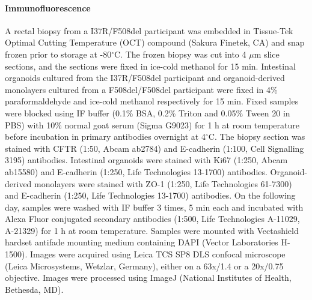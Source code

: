 \paragraph{Immunofluorescence} A rectal biopsy from a I37R/F508del participant was embedded in Tissue-Tek Optimal Cutting Temperature (OCT) compound (Sakura Finetek, CA) and snap frozen prior to storage at -80$^\circ$C. The frozen biopsy was cut into 4 $\mu$m slice sections, and the sections were fixed in ice-cold methanol for 15 min. Intestinal organoids cultured from the I37R/F508del participant and organoid-derived monolayers cultured from a F508del/F508del participant were fixed in 4\% paraformaldehyde and ice-cold methanol respectively for 15 min. Fixed samples were blocked using IF buffer (0.1\% BSA, 0.2\% Triton and 0.05\% Tween 20 in PBS) with 10\% normal goat serum (Sigma G9023) for 1 h at room temperature before incubation in primary antibodies overnight at 4$^\circ$C. The biopsy section was stained with CFTR (1:50, Abcam ab2784) and E-cadherin (1:100, Cell Signalling 3195) antibodies. Intestinal organoids were stained with Ki67 (1:250, Abcam ab15580) and E-cadherin (1:250, Life Technologies 13-1700) antibodies. Organoid-derived monolayers were stained with ZO-1 (1:250, Life Technologies 61-7300) and E-cadherin (1:250, Life Technologies 13-1700) antibodies. On the following day, samples were washed with IF buffer 3 times, 5 min each and incubated with Alexa Fluor conjugated secondary antibodies (1:500, Life Technologies A-11029, A-21329) for 1 h at room temperature. Samples were mounted with Vectashield hardset antifade mounting medium containing DAPI (Vector Laboratories H-1500). Images were acquired using Leica TCS SP8 DLS confocal microscope (Leica Microsystems, Wetzlar, Germany), either on a 63x/1.4 or a 20x/0.75 objective. Images were processed using ImageJ (National Institutes of Health, Bethesda, MD).


